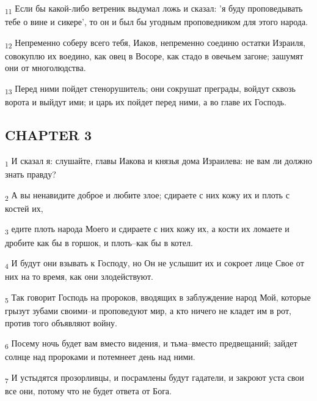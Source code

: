 \begin{tcolorbox}
\textsubscript{11} Если бы какой-либо ветреник выдумал ложь и сказал: 'я буду проповедывать тебе о вине и сикере', то он и был бы угодным проповедником для этого народа.
\end{tcolorbox}
\begin{tcolorbox}
\textsubscript{12} Непременно соберу всего тебя, Иаков, непременно соединю остатки Израиля, совокуплю их воедино, как овец в Восоре, как стадо в овечьем загоне; зашумят они от многолюдства.
\end{tcolorbox}
\begin{tcolorbox}
\textsubscript{13} Перед ними пойдет стенорушитель; они сокрушат преграды, войдут сквозь ворота и выйдут ими; и царь их пойдет перед ними, а во главе их Господь.
\end{tcolorbox}
\subsection{CHAPTER 3}
\begin{tcolorbox}
\textsubscript{1} И сказал я: слушайте, главы Иакова и князья дома Израилева: не вам ли должно знать правду?
\end{tcolorbox}
\begin{tcolorbox}
\textsubscript{2} А вы ненавидите доброе и любите злое; сдираете с них кожу их и плоть с костей их,
\end{tcolorbox}
\begin{tcolorbox}
\textsubscript{3} едите плоть народа Моего и сдираете с них кожу их, а кости их ломаете и дробите как бы в горшок, и плоть--как бы в котел.
\end{tcolorbox}
\begin{tcolorbox}
\textsubscript{4} И будут они взывать к Господу, но Он не услышит их и сокроет лице Свое от них на то время, как они злодействуют.
\end{tcolorbox}
\begin{tcolorbox}
\textsubscript{5} Так говорит Господь на пророков, вводящих в заблуждение народ Мой, которые грызут зубами своими--и проповедуют мир, а кто ничего не кладет им в рот, против того объявляют войну.
\end{tcolorbox}
\begin{tcolorbox}
\textsubscript{6} Посему ночь будет вам вместо видения, и тьма--вместо предвещаний; зайдет солнце над пророками и потемнеет день над ними.
\end{tcolorbox}
\begin{tcolorbox}
\textsubscript{7} И устыдятся прозорливцы, и посрамлены будут гадатели, и закроют уста свои все они, потому что не будет ответа от Бога.
\end{tcolorbox}
